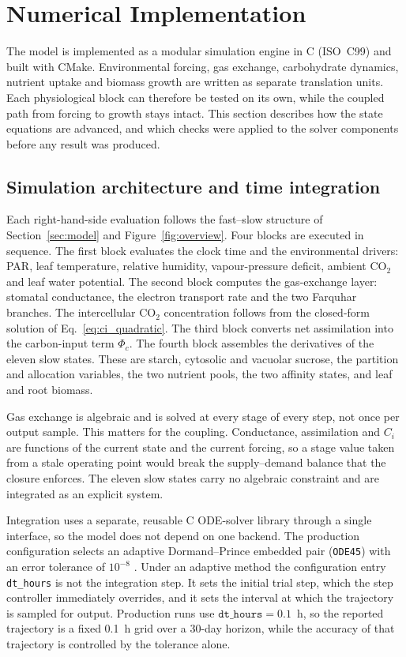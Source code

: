 \section{Numerical Implementation}
\label{sec:numerics}
\label{sec:implementation}

The model is implemented as a modular simulation engine in C (ISO~C99) and
built with CMake. Environmental forcing, gas exchange, carbohydrate dynamics,
nutrient uptake and biomass growth are written as separate translation units.
Each physiological block can therefore be tested on its own, while the coupled
path from forcing to growth stays intact. This section describes how the state
equations are advanced, and which checks were applied to the solver components
before any result was produced.

\subsection{Simulation architecture and time integration}

Each right-hand-side evaluation follows the fast--slow structure of
Section~\ref{sec:model} and Figure~\ref{fig:overview}. Four blocks are executed
in sequence. The first block
evaluates the clock time and the environmental drivers: PAR, leaf temperature,
relative humidity, vapour-pressure deficit, ambient CO$_2$ and leaf water
potential. The second block computes the gas-exchange layer: stomatal
conductance, the electron transport rate and the two Farquhar branches. The
intercellular CO$_2$ concentration follows from the closed-form solution of
Eq.~\eqref{eq:ci_quadratic}. The third block converts net assimilation into the
carbon-input term $\Phi_c$. The fourth block assembles the derivatives of the
eleven slow states. These are starch, cytosolic and vacuolar sucrose, the
partition and allocation variables, the two nutrient pools, the two affinity
states, and leaf and root biomass.

Gas exchange is algebraic and is solved at every stage of every step, not once
per output sample. This matters for the coupling. Conductance, assimilation and
$C_i$ are functions of the current state and the current forcing, so a stage
value taken from a stale operating point would break the supply--demand balance
that the closure enforces. The eleven slow states carry no algebraic
constraint and are integrated as an explicit system.

Integration uses a separate, reusable C ODE-solver library through a single
interface, so the model does not depend on one backend. The production
configuration selects an adaptive Dormand--Prince embedded pair
(\texttt{ODE45}) with an error tolerance of $10^{-8}$
\citep{HairerNorsettWanner1993}. Under an adaptive method the configuration
entry \texttt{dt\_hours} is not the integration step. It sets the initial trial
step, which the step controller immediately overrides, and it sets the interval
at which the trajectory is sampled for output. Production runs use
$\texttt{dt\_hours}=0.1$~h, so the reported trajectory is a fixed
0.1~h grid over a 30-day horizon, while the accuracy of that trajectory is
controlled by the tolerance alone.

